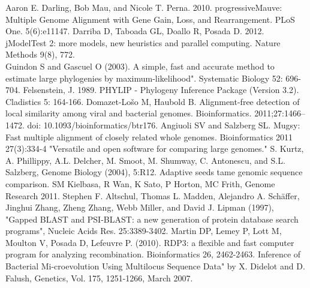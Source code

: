 \documentclass[12pt]{article}
\begin{document}
\newpage
\begin{thebibliography}{9}
Aaron E. Darling, Bob Mau, and Nicole T. Perna. 2010.  progressiveMauve: Multiple Genome Alignment with Gene Gain, Loss, and Rearrangement.  PLoS One.  5(6):e11147. 
Darriba D, Taboada GL, Doallo R, Posada D. 2012. jModelTest 2: more models, new heuristics and parallel computing. Nature Methods 9(8), 772.\\
Guindon S and Gascuel O (2003). A simple, fast and accurate method to estimate large phylogenies by maximum-likelihood". Systematic Biology 52: 696-704.
Felsenstein, J. 1989. PHYLIP - Phylogeny Inference Package (Version 3.2). Cladistics 5: 164-166. 
Domazet-Lošo M, Haubold B. Alignment-free detection of local similarity among viral and bacterial genomes. Bioinformatics. 2011;27:1466–1472. doi: 10.1093/bioinformatics/btr176.
Angiuoli SV and Salzberg SL. Mugsy: Fast multiple alignment of closely related whole genomes. Bioinformatics 2011 27(3):334-4
"Versatile and open software for comparing large genomes." S. Kurtz, A. Phillippy, A.L. Delcher, M. Smoot, M. Shumway, C. Antonescu, and S.L. Salzberg, Genome Biology (2004), 5:R12.
Adaptive seeds tame genomic sequence comparison. SM Kielbasa, R Wan, K Sato, P Horton, MC Frith, Genome Research 2011.
Stephen F. Altschul, Thomas L. Madden, Alejandro A. Schäffer, Jinghui Zhang, Zheng Zhang, Webb Miller, and David J. Lipman (1997), "Gapped BLAST and PSI-BLAST: a new generation of protein database search programs", Nucleic Acids Res. 25:3389-3402.
Martin DP, Lemey P, Lott M, Moulton V, Posada D, Lefeuvre P. (2010). RDP3: a flexible and fast computer program for analyzing recombination. Bioinformatics 26, 2462-2463.
Inference of Bacterial Mi-croevolution Using Multilocus Sequence Data" by X. Didelot and D. Falush, Genetics, Vol. 175,
1251-1266, March 2007.
\end{thebibliography}
\end{document}
